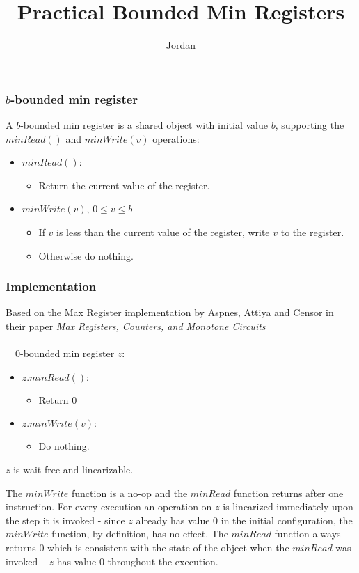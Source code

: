 \documentclass{beamer}
\title{Practical Bounded Min Registers}
\author{Jordan}
\begin{document}
\frame{\titlepage}

\begin{frame}
\frametitle{$b$-bounded min register}
	A $b$-bounded min register is a shared object with initial value $b$, supporting the $minRead()$ and $minWrite(v)$ operations:
	\begin{itemize}
		\item $minRead()$: 
		\begin{itemize}
			\item Return the current value of the register.
		\end{itemize}
		\item $minWrite(v)$, $0 \le v \le b$ 
		\begin{itemize}
			\item If $v$ is less than the current value of the register, write $v$ to the register. 
			\item Otherwise do nothing.
		\end{itemize}
	\end{itemize}
\end{frame}
\begin{frame}
\frametitle{Implementation}
	Based on the Max Register implementation by Aspnes, Attiya and Censor in their paper \textit{Max Registers, Counters, and Monotone Circuits}
	\\~\
	\\~\
	$0$-bounded min register $z$:
	\begin{itemize}
		\item $z.minRead():$
			\begin{itemize}
				\item Return 0
			\end{itemize} 
		\item $z.minWrite(v):$
			\begin{itemize}
				\item Do nothing.
			\end{itemize}
	\end{itemize}
\end{frame}
\begin{frame}
	\begin{lemma}
		$z$ is wait-free and linearizable.
	\end{lemma}
	\begin{lemma}
		The $minWrite$ function is a no-op and the $minRead$ function returns after one instruction.
		For every execution an operation on $z$ is linearized immediately upon the step it is invoked - 
		since $z$ already has value 0 in the initial configuration, the $minWrite$ function, by definition, has no effect.
		The $minRead$ function always returns 0 which is consistent with the state of the object when 
		the $minRead$ was invoked -- $z$ has value 0 throughout the execution.
	\end{lemma}
\end{frame}
\end{document}
